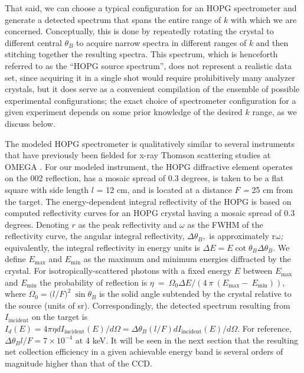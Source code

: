That said, we can choose a typical configuration for an HOPG
spectrometer and generate a detected spectrum that spans the entire
range of \(k\) with which we are concerned. Conceptually, this is done
by repeatedly rotating the crystal to different central \(\theta_{B}\)
to acquire narrow spectra in different ranges of \(k\) and then
stitching together the resulting spectra. This spectrum, which is
henceforth referred to as the ``HOPG source spectrum'', does not
represent a realistic data set, since acquiring it in a single shot
would require prohibitively many analyzer crystals, but it does serve as
a convenient compilation of the ensemble of possible experimental
configurations; the exact choice of spectrometer configuration for a
given experiment depends on some prior knowledge of the desired \(k\)
range, as we discuss below.

The modeled HOPG spectrometer is qualitatively similar to several
instruments that have previously been fielded for x-ray Thomson
scattering studies at OMEGA
\hyperref[y.-jae-hyuck-i.-jung-bin-p.-jong-bok-j.-hojeong-and-p.-g.-costas-applied-physics-letters-100-233124-2012.]\cite{YOO2012GRAPHENE, VISCO2012MEASUREMENT}.
For our modeled instrument, the HOPG diffractive element operates on the
002 reflection, has a mosaic spread of 0.3 degrees, is taken to be a
flat square with side length \(l\) = 12 cm, and is located at a distance
\(F\) \emph{=} 25 cm from the target. The energy-dependent integral
reflectivity of the HOPG is based on computed reflectivity curves
\hyperref[a.-k.-freund-a.-munkholm-and-s.-brennan-optics-for-high-brightness-synchrotron-radiation-beamlines-ii-2856-68-1996.]\cite{FREUND1996X}
for an HOPG crystal having a mosaic spread of 0.3 degrees. Denoting
\(r\) as the peak reflectivity and \(\omega\) as the FWHM of the
reflectivity curve, the angular integral reflectivity,
\(\Delta\theta_{B},\) is approximately \(\text{rω}\)\emph{;}
equivalently, the integral reflectivity in energy units is
\(\Delta E = E\cot{\theta_{B}\Delta\theta_{B}}\). We define \(E_{\max}\)
and \(E_{\min}\) as the maximum and minimum energies diffracted by the
crystal. For isotropically-scattered photons with a fixed energy \(E\)
between \(E_{\max}\) and \(E_{\min}\) the probability of reflection is
\(\eta\  = \ \Omega_{0}\Delta E/(4\ \pi\ \left( E_{\max} - \ E_{\min} \right))\),
where \(\Omega_{0} = ({l/F)}^{2}\ \sin\theta_{B}\) is the solid angle
subtended by the crystal relative to the source (units of sr).
Correspondingly, the detected spectrum resulting from
\(I_{\text{incident}}\) on the target is
\(I_{d}\left( E \right) = 4\pi\eta dI_{\text{incident}}\left( E \right)/d\Omega = \Delta\theta_{B}(l/F)dI_{\text{incident}}\left( E \right)/d\Omega\).
For reference, \(\Delta\theta_{B}l/F = 7 \times 10^{- 4}\) at 4 keV. It
will be seen in the next section that the resulting net collection
efficiency in a given achievable energy band is several orders of
magnitude higher than that of the CCD.

